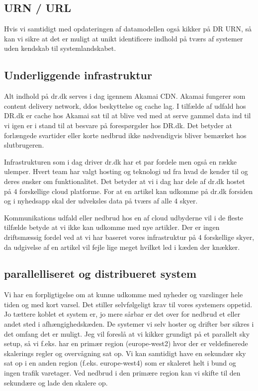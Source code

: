 \documentclass{article}
\begin{document}
\subsection{URN / URL}
Hvis vi samtidigt med opdateringen af datamodellen også kikker på DR URN, så kan vi sikre at det er muligt at unikt identificere indhold på tværs af systemer uden kendskab til systemlandskabet. 


\subsection{Underliggende infrastruktur}
Alt indhold på dr.dk serves i dag igennem Akamai CDN. Akamai fungerer som content delivery network, ddos beskyttelse og cache lag. I tilfælde af udfald hos DR.dk er cache hos Akamai sat til at blive ved med at serve gammel data ind til vi igen er i stand til at besvare på forespørgsler hos DR.dk. Det betyder at forlængede svartider eller korte nedbrud ikke nødvendigvis bliver bemærket hos slutbrugeren.

Infrastrukturen som i dag driver dr.dk har et par fordele men også en række ulemper. Hvert team har valgt hosting og teknologi ud fra hvad de kender til og deres ønsker om funktionalitet. Det betyder at vi i dag har dele af dr.dk hostet på 4 forskellige cloud platforme.
For at en artikel kan udkomme på dr.dk forsiden og i nyhedsapp skal der udveksles data på tværs af alle 4 skyer.

Kommunikations udfald eller nedbrud hos en af cloud udbyderne vil i de fleste tilfælde betyde at vi ikke kan udkomme med nye artikler. Der er ingen driftsmæssig fordel ved at vi har baseret vores infrastruktur på 4 forskellige skyer, da udgivelse af en artikel vil fejle lige meget hvilket led i kæden der knækker. 

\subsection{parallelliseret og distribueret system}
Vi har en forpligtigelse om at kunne udkomme med nyheder og varslinger hele tiden og med kort varsel. Det stiller selvfølgeligt krav til vores systemers oppetid. Jo tættere koblet et system er, jo mere sårbar er det over for nedbrud et eller andet sted i afhængighedskæden.
De systemer vi selv hoster og drifter bør sikres i det omfang det er muligt. Jeg vil foreslå at vi kikker grundigt på et parallelt sky setup, så vi f.eks. har en primær region (europe-west2) hvor der er veldefinerede skalerings regler og overvågning sat op. Vi kan samtidigt have en sekundær sky sat op i en anden region (f.eks. europe-west4) som er skaleret helt i bund og ingen trafik varetager.
Ved nedbrud i den primære region kan vi skifte til den sekundære og lade den skalere op.
\end{document}
